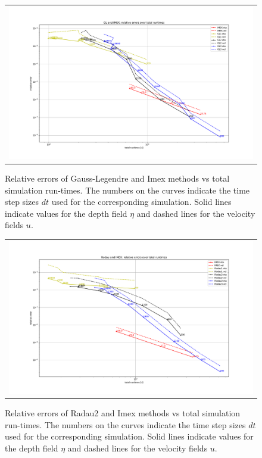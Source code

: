 \documentclass[a4paper, 12pt]{article}
\begin{document}
\begin{figure}[h]\centering
\begin{tabular}{c}
 \hspace{-0.0em}\includegraphics[scale=0.42]{Images/gl_imex.pdf}
\end{tabular}
 \caption{Relative errors of Gauss-Legendre and Imex methods vs total simulation run-times. The numbers on the curves indicate the time step sizes $dt$ used for the corresponding simulation. Solid lines indicate values for the depth field $\eta$ and dashed lines for the velocity fields $ u$.
  }
 \label{err_vs_runtime_gl_imex}
\end{figure}

\begin{figure}[h]\centering
\begin{tabular}{c}
 \hspace{-0.0em}\includegraphics[scale=0.42]{Images/rd_imex.pdf}
\end{tabular}
 \caption{Relative errors of Radau2 and Imex methods vs total simulation run-times. The numbers on the curves indicate the time step sizes $dt$ used for the corresponding simulation. Solid lines indicate values for the depth field $\eta$ and dashed lines for the velocity fields $ u$.
  }
 \label{err_vs_runtime_rd_imex}
\end{figure}
\end{document}
